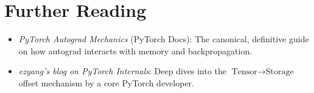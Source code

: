 \section{Further Reading}
\label{ch:03:sec:further}

\begin{itemize}
  \item \textit{PyTorch Autograd Mechanics} (PyTorch Docs): The canonical, definitive guide on how autograd interacts with memory and backpropagation.
  \item \textit{ezyang's blog on PyTorch Internals}: Deep dives into the $\text{Tensor} \to \text{Storage}$ offset mechanism by a core PyTorch developer.
\end{itemize}
